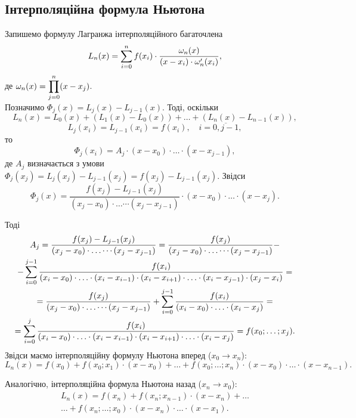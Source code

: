 \subsection{Інтерполяційна формула Ньютона}

Запишемо формулу Лагранжа інтерполяційного багаточлена
\begin{equation}
    \label{eq:6.15}
    L_n(x) = \displaystyle\sum\limits_{i=0}^n f(x_i) \cdot \dfrac{\omega_n(x)}{(x-x_i)\cdot \omega_n'(x_i)},
\end{equation}
де $\omega_n(x) = \displaystyle\prod\limits_{j=0}^n (x-x_j)$. \\

Позначимо $\Phi_j(x) = L_j(x) - L_{j-1}(x)$. Тоді, оскільки
\[ L_n(x) = L_0(x) + (L_1(x) - L_0(x)) + \ldots + (L_n(x) - L_{n-1}(x)), \]
\[ L_j(x_i) = L_{j-1}(x_i) = f(x_i), \quad i = \overline{0,j-1},\]
то
\begin{equation}
    \label{eq:6.16}
    \Phi_j(x_i) = A_j \cdot (x - x_0) \cdot \ldots \cdot (x - x_{j-1}),
\end{equation}
де $A_j$ визначається з умови $\Phi_j(x_j) = L_j(x_j) - L_{j-1}(x_j) = f(x_j) - L_{j-1}(x_j)$. Звідси
\[ \Phi_j(x) = \dfrac{f(x_j)-L_{j-1}(x_j)}{(x_j-x_0)\cdot\ldots\cdots(x_j-x_{j-1})}\cdot(x-x_0)\cdot\ldots\cdot(x-x_j).\] 

Тоді
\begin{multline*}
    A_j = \dfrac{f(x_j)-L_{j-1}(x_j)}{(x_j-x_0)\cdot\ldots\cdots(x_j-x_{j-1})} = \dfrac{f(x_j)}{(x_j-x_0)\cdot\ldots\cdots(x_j-x_{j-1})} - \\
    - \displaystyle\sum\limits_{i=0}^{j-1} \dfrac{f(x_i)}{(x_i-x_0)\cdot\ldots\cdot(x_i-x_{i-1})\cdot(x_i-x_{i+1})\cdot\ldots\cdot(x_i-x_{j-1})\cdot(x_j-x_i)} = \\
    = \dfrac{f(x_j)}{(x_j-x_0)\cdot\ldots\cdots(x_j-x_{j-1})} + \displaystyle\sum\limits_{i=0}^{j-1} \dfrac{f(x_i)}{(x_i-x_0)\cdot\ldots\cdot(x_i-x_j)} =  \\
    = \displaystyle\sum\limits_{i=0}^j \dfrac{f(x_i)}{(x_i-x_0)\cdot\ldots\cdot(x_i-x_{i-1})\cdot(x_i-x_{i+1})\cdot\ldots\cdot(x_i-x_j)} = f(x_0;\ldots;x_j).
\end{multline*}
Звідси маємо інтерполяційну формулу Ньютона вперед ($x_0 \to x_n$):
\begin{equation}
    \label{eq:6.17}
    L_n(x) = f(x_0) + f(x_0;x_1) \cdot (x-x_0) + \ldots + f(x_0;\ldots;x_n) \cdot (x-x_0) \cdot \ldots \cdot (x-x_{n-1}).
\end{equation}

Аналогічно, інтерполяційна формула Ньютона назад ($x_n\to x_0$):
\begin{multline}
    \label{eq:6.18}
    L_n(x) = f(x_n) + f(x_n;x_{n-1}) \cdot (x-x_n) + \ldots \\
    \ldots + f(x_n;\ldots;x_0) \cdot (x-x_n) \cdot \ldots \cdot (x-x_1).
\end{multline}

